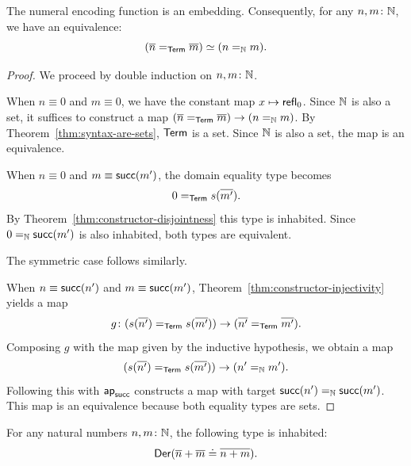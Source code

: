 \begin{lem}\label{lem:num-is-embedding}
 The numeral encoding function is an embedding. Consequently, for any\/ $n,m\colon\N$, we have an equivalence:
 \[
 ({\overline{n}}\mathrel{=_{\mathsf{Term}}}{\overline{m}}) \simeq (n\mathrel{=_{\mathbb{N}}}m).
 \]
\end{lem}

\begin{proof}
    We proceed by double induction on $n,m\colon\N$.
    
    When $n\equiv0$ and $m\equiv0$, we have the constant map $x\mapsto\mathsf{refl}_0$. Since $\mathbb{N}$ is also a set, it suffices to construct a map $({\overline{n}}\mathrel{=_{\mathsf{Term}}}{\overline{m}})\to(n\mathrel{=_{\mathbb{N}}}m)$. By Theorem~\ref{thm:syntax-are-sets}, $\mathsf{Term}$ is a set. Since $\mathbb{N}$ is also a set, the map is an equivalence.
    
    When $n\equiv0$ and $m\equiv\mathsf{succ}(m')$, the domain equality type becomes
    \[
        0\mathrel{=_{\mathsf{Term}}}s({\overline{m'}}).
    \]
    By Theorem~\ref{thm:constructor-disjointness} this type is inhabited. Since $0\mathrel{=_{\mathbb{N}}}\mathsf{succ}(m')$ is also inhabited, both types are equivalent.

    The symmetric case follows similarly.
    
    When $n\equiv\mathsf{succ}(n')$ and $m\equiv\mathsf{succ}(m')$, Theorem~\ref{thm:constructor-injectivity} yields a map
    \[
        g\colon(s(\num{n'})\eq{\fun{Term}}s(\num{m'}))
            \to(\num{n'}\eq{\fun{Term}}\num{m'}).
    \]
    Composing $g$ with the map given by the inductive hypothesis, we obtain a map
    \[
        (s({\overline{n'}})\mathrel{=_{\mathsf{Term}}}s({\overline{m'}}))
            \to(n'\mathrel{=_{\mathbb{N}}} m').
    \]
    Following this with $\mathsf{ap}_{\mathsf{succ}}$ constructs a map with target $\mathsf{succ}(n')\mathrel{=_{\mathbb{N}}}\mathsf{succ}(m')$. This map is an equivalence because both equality types are sets.
    
\end{proof}

\begin{lem}
    \label{lem:numeral-addition}
    For any natural numbers\/ $n,m\colon\N$, the following type is inhabited:
    \[
        \mathsf{Der}({\overline{n}} + {\overline{m}} \doteq {\overline{n+m}}).
    \]
\end{lem}

